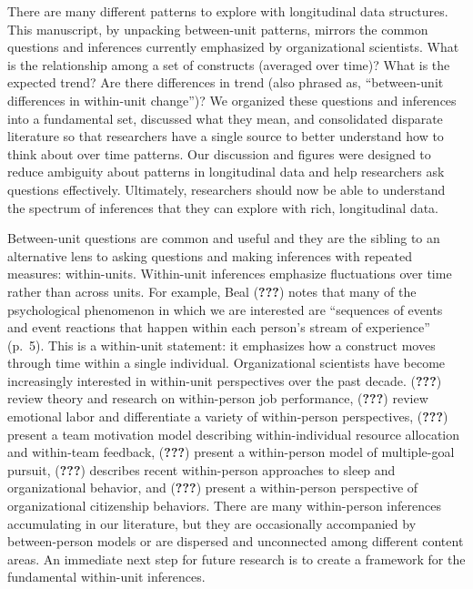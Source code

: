 \documentclass[english,,man]{apa6}
\begin{document}
There are many different patterns to explore with longitudinal data structures. This manuscript, by unpacking between-unit patterns, mirrors the common questions and inferences currently emphasized by organizational scientists. What is the relationship among a set of constructs (averaged over time)? What is the expected trend? Are there differences in trend (also phrased as, \enquote{between-unit differences in within-unit change})? We organized these questions and inferences into a fundamental set, discussed what they mean, and consolidated disparate literature so that researchers have a single source to better understand how to think about over time patterns. Our discussion and figures were designed to reduce ambiguity about patterns in longitudinal data and help researchers ask questions effectively. Ultimately, researchers should now be able to understand the spectrum of inferences that they can explore with rich, longitudinal data.

Between-unit questions are common and useful and they are the sibling to an alternative lens to asking questions and making inferences with repeated measures: within-units. Within-unit inferences emphasize fluctuations over time rather than across units. For example, Beal ({\textbf{???}}) notes that many of the psychological phenomenon in which we are interested are \enquote{sequences of events and event reactions that happen within each person's stream of experience} (p.~5). This is a within-unit statement: it emphasizes how a construct moves through time within a single individual. Organizational scientists have become increasingly interested in within-unit perspectives over the past decade. ({\textbf{???}}) review theory and research on within-person job performance, ({\textbf{???}}) review emotional labor and differentiate a variety of within-person perspectives, ({\textbf{???}}) present a team motivation model describing within-individual resource allocation and within-team feedback, ({\textbf{???}}) present a within-person model of multiple-goal pursuit, ({\textbf{???}}) describes recent within-person approaches to sleep and organizational behavior, and ({\textbf{???}}) present a within-person perspective of organizational citizenship behaviors. There are many within-person inferences accumulating in our literature, but they are occasionally accompanied by between-person models or are dispersed and unconnected among different content areas. An immediate next step for future research is to create a framework for the fundamental within-unit inferences.
\end{document}

